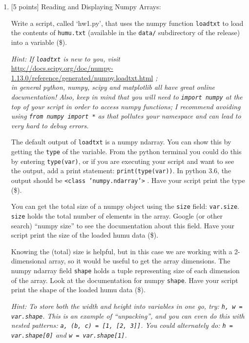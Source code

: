 \documentclass[10pt]{article}
\begin{document}
\begin{enumerate}
{\bf Solution.} $<$Solution goes here$>$\\


\newpage
\item \label{prob:6} [5 points]
Reading and Displaying Numpy Arrays:

Write a script, called `hw1.py', that uses the numpy function {\tt loadtxt} to load the contents of {\tt humu.txt} (available in the {\tt data/} subdirectory of the release) into a variable (\$).

{\em Hint: If {\tt loadtxt} is new to you, visit} \\
\url{http://docs.scipy.org/doc/numpy-1.13.0/reference/generated/numpy.loadtxt.html} {\em ; \\ in general python, numpy, scipy and matplotlib all have great online documentation!  Also, keep in mind that you will need to {\tt import numpy} at the top of your script in order to access numpy functions; I recommend avoiding using {\tt from numpy import *} as that pollutes your namespace and can lead to very hard to debug errors. }

The default output of {\tt loadtxt} is a numpy ndarray.  You can show this by getting the {\tt type} of the variable.  From the python terminal you could do this by entering {\tt type(var)}, or if you are executing your script and want to see the output, add a print statement: {\tt print(type(var))}.  In python 3.6, the output should be {\tt <class 'numpy.ndarray'>} .  Have your script print the type (\$).

You can get the total size of a numpy object using the {\tt size} field: {\tt var.size}.  {\tt size} holds the total number of elements in the array.  Google (or other search) ``numpy size'' to see the documentation about this field.  Have your script print the size of the loaded humu data (\$).

Knowing the (total) size is helpful, but in this case we are working with a 2-dimensional array, so it would be useful to get the array dimensions.  The numpy ndarray field {\tt shape} holds a tuple representing size of each dimension of the array.  Look at the documentation for numpy {\tt shape}.  Have your script print the shape of the loaded humu data (\$).

{\em Hint: To store both the width and height into variables in one go, try: {\tt h, w = var.shape}.  This is an example of ``unpacking'', and you can even do this with nested patterns: {\tt a, (b, c) = [1, [2, 3]]}.  You could alternately do: {\tt h = var.shape[0]} and {\tt w = var.shape[1]}.}


\end{enumerate}
\end{document}
